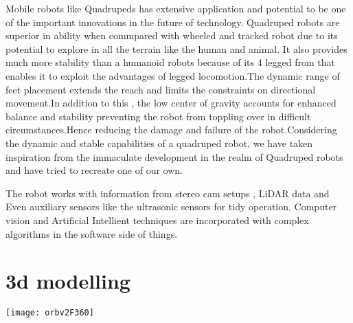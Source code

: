 \documentclass[12pt,a4paper]{report}
\begin{document}
Mobile robots like Quadrupeds has extensive application and potential to be one of the important innovations in the future of technology. Quadruped robots are superior in ability when commpared with wheeled and tracked robot due to its potential to explore in all the terrain like the human and animal. It also provides much more stability than a humanoid robots because of its 4 legged from that enables it to exploit the advantages of legged locomotion.The dynamic range of feet placement extends the reach and limits the constraints on directional movement.In addition to this , the low center of gravity accounts for enhanced balance and stability preventing the robot from toppling over in difficult circumstances.Hence reducing the damage and failure of the robot.Considering the dynamic and stable capabilities of a quadruped robot, we have taken inspiration from the immaculate development in the realm of Quadruped robots and have tried to recreate one of our own.

The robot works with information from stereo cam setups , LiDAR data and Even auxiliary sensors like the ultrasonic sensors  for tidy operation. Computer vision and Artificial Intellient techniques are incorporated with complex algorithms in the software side of things. 

\section{3d modelling}

\texttt{[image: orbv2F360]}
\end{document}
